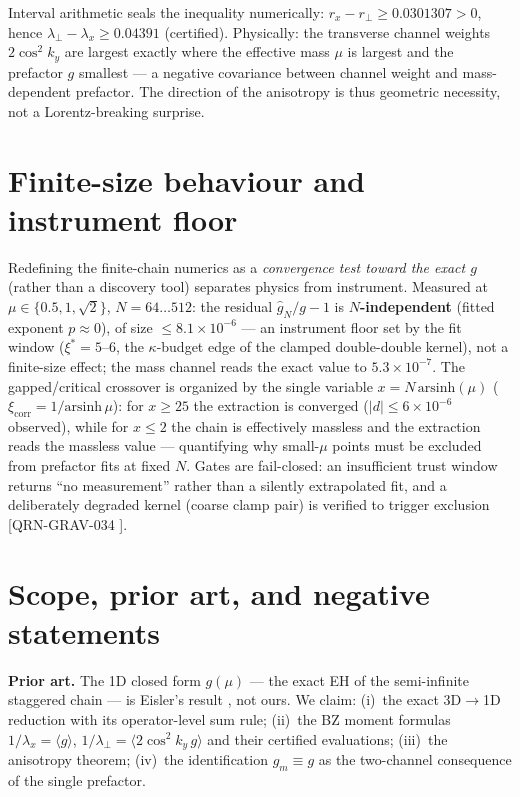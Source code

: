 \documentclass[aps,prb,preprint,nofootinbib]{revtex4-2}
\begin{document}
Interval arithmetic seals the inequality numerically:
$r_x - r_\perp \ge 0.0301307 > 0$, hence
$\boxed{\lambda_\perp - \lambda_x \ge 0.04391}$ (certified). Physically: the
transverse channel weights $2\cos^2 k_y$ are largest exactly where the
effective mass $\mu$ is largest and the prefactor $g$ smallest --- a negative
covariance between channel weight and mass-dependent prefactor. The direction
of the anisotropy is thus geometric necessity, not a Lorentz-breaking surprise.

\section{Finite-size behaviour and instrument floor}

Redefining the finite-chain numerics as a \emph{convergence test toward the
exact $g$} (rather than a discovery tool) separates physics from instrument.
Measured at $\mu \in \{0.5, 1, \sqrt 2\}$, $N = 64\ldots512$: the residual
$\hat g_N/g - 1$ is \textbf{$N$-independent} (fitted exponent $p \approx 0$),
of size $\le 8.1\times10^{-6}$ --- an instrument floor set by the fit window
($\xi^* = 5$--$6$, the $\kappa$-budget edge of the clamped double-double
kernel), not a finite-size effect; the mass channel reads the exact value to
$5.3\times10^{-7}$. The gapped/critical crossover is organized by the single
variable $x = N\,\mathrm{arsinh}(\mu)$
($\xi_{\mathrm{corr}} = 1/\mathrm{arsinh}\,\mu$): for $x \ge 25$ the extraction
is converged ($|d| \le 6\times10^{-6}$ observed), while for $x \le 2$ the chain
is effectively massless and the extraction reads the massless value ---
quantifying why small-$\mu$ points must be excluded from prefactor fits at
fixed $N$. Gates are fail-closed: an insufficient trust window returns ``no
measurement'' rather than a silently extrapolated fit, and a deliberately
degraded kernel (coarse clamp pair) is verified to trigger exclusion
[QRN-GRAV-034 \cite{Repo}].

\section{Scope, prior art, and negative statements}

\textbf{Prior art.} The 1D closed form $g(\mu)$ --- the exact EH of the
semi-infinite staggered chain --- is Eisler's result \cite{Eisler2024}, not
ours. We claim: (i)~the exact 3D$\to$1D reduction with its operator-level sum
rule; (ii)~the BZ moment formulas
$1/\lambda_x = \langle g\rangle$, $1/\lambda_\perp = \langle 2\cos^2 k_y\, g\rangle$
and their certified evaluations; (iii)~the anisotropy theorem; (iv)~the
identification $g_m \equiv g$ as the two-channel consequence of the single
prefactor.
\end{document}
